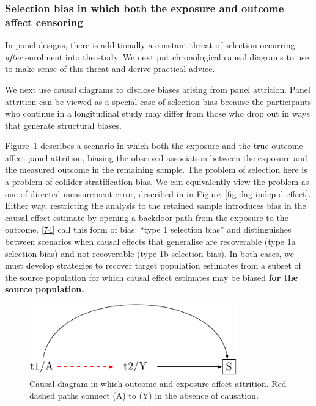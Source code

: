 \documentclass[
  singlecolumn]{article}
\begin{document}
\hypertarget{selection-bias-in-which-both-the-exposure-and-outcome-affect-censoring}{%
\subsubsection{Selection bias in which both the exposure and outcome
affect
censoring}\label{selection-bias-in-which-both-the-exposure-and-outcome-affect-censoring}}

In panel designs, there is additionally a constant threat of selection
occurring \emph{after} enrolment into the study. We next put
chronological causal diagrams to use to make sense of this threat and
derive practical advice.

We next use causal diagrams to disclose biases arising from panel
attrition. Panel attrition can be viewed as a special case of selection
bias because the participants who continue in a longitudinal study may
differ from those who drop out in ways that generate structural biases.

Figure~\ref{fig-dag-8-5} describes a scenario in which both the exposure
and the true outcome affect panel attrition, biasing the observed
association between the exposure and the measured outcome in the
remaining sample. The problem of selection here is a problem of collider
stratification bias. We can equivalently view the problem as one of
directed measurement error, described in in
Figure~\ref{fig-dag-indep-d-effect}. Either way, restricting the
analysis to the retained sample introduces bias in the causal effect
estimate by opening a backdoor path from the exposure to the outcome.
{[}\protect\hyperlink{ref-lu2022}{74}{]} call this form of bias: ``type
1 selection bias'' and distinguishes between scenarios when causal
effects that generalise are recoverable (type 1a selection bias) and not
recoverable (type 1b selection bias). In both cases, we must develop
strategies to recover target population estimates from a subset of the
source population for which causal effect estimates may be biased
\textbf{for the source population.}

\begin{figure}

{\centering \includegraphics[width=0.8\textwidth,height=\textheight]{causal-dags_files/figure-pdf/fig-dag-8-5-1.pdf}

}

\caption{\label{fig-dag-8-5}Causal diagram in which outcome and exposure
affect attrition. Red dashed paths connect (A) to (Y) in the absence of
causation.}

\end{figure}
\end{document}
